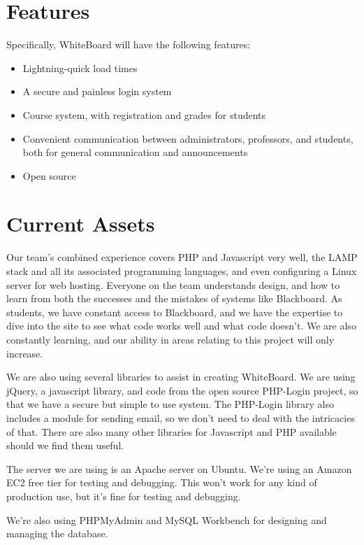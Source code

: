 \documentclass{article}
\begin{document}
\section{Features}

Specifically, WhiteBoard will have the following features:
\begin{itemize}
    \item Lightning-quick load times
    \item A secure and painless login system
    \item Course system, with registration and grades for students
    \item Convenient communication between administrators, professors, and
        students, both for general communication and announcements
    \item Open source
\end{itemize}

\section{Current Assets}

Our team's combined experience covers PHP and Javascript very well, the LAMP
stack and all its associated programming languages, and even configuring a
Linux server for web hosting. Everyone on the team understands design, and how
to learn from both the successes and the mistakes of systems like Blackboard.
As students, we have constant access to Blackboard, and we have the expertise
to dive into the site to see what code works well and what code doesn't. We are
also constantly learning, and our ability in areas relating to this project
will only increase.

We are also using several libraries to assist in creating WhiteBoard. We are
using jQuery, a javascript library, and code from the open source PHP-Login
project, so that we have a secure but simple to use system. The PHP-Login
library also includes a module for sending email, so we don't need to deal with
the intricacies of that. There are also many other libraries for Javascript and
PHP available should we find them useful.

The server we are using is an Apache server on Ubuntu. We're using an Amazon
EC2 free tier for testing and debugging. This won't work for any kind of
production use, but it's fine for testing and debugging.

We're also using PHPMyAdmin and MySQL Workbench for designing and managing the
database.
\end{document}
